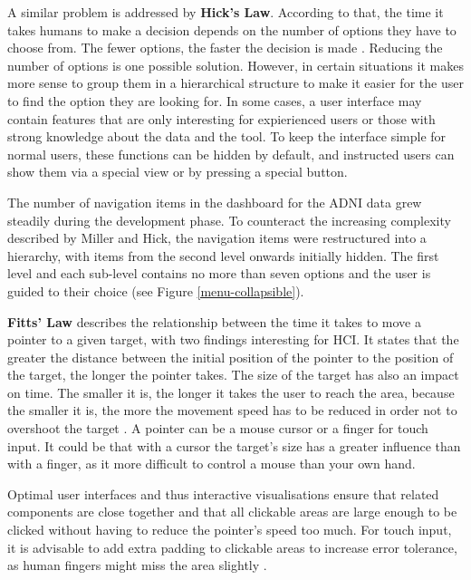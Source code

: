 \documentclass[11pt]{article}
\begin{document}
A similar problem is addressed by \textbf{Hick's Law}. According to that, the time it takes humans to make a decision depends on the number of options they have to choose from. The fewer options, the faster the decision is made \parencite{soegaard_hicks_2020}. Reducing the number of options is one possible solution. However, in certain situations it makes more sense to group them in a hierarchical structure to make it easier for the user to find the option they are looking for. In some cases, a user interface may contain features that are only interesting for expierienced users or those with strong knowledge about the data and the tool. To keep the interface simple for normal users, these functions can be hidden by default, and instructed users can show them via a special view or by pressing a special button. 

The number of navigation items in the dashboard for the ADNI data grew steadily during the development phase. To counteract the increasing complexity described by Miller and Hick, the navigation items were restructured into a hierarchy, with items from the second level onwards initially hidden. The first level and each sub-level contains no more than seven options and the user is guided to their choice (see Figure \ref{menu-collapsible}).

\textbf{Fitts' Law} describes the relationship between the time it takes to move a pointer to a given target, with two findings interesting for HCI. It states that the greater the distance between the initial position of the pointer to the position of the target, the longer the pointer takes. The size of the target has also an impact on time. The smaller it is, the longer it takes the user to reach the area, because the smaller it is, the more the movement speed has to be reduced in order not to overshoot the target \parencite{budiu_fittss_2022}. A pointer can be a mouse cursor or a finger for touch input. It could be that with a cursor the target's size has a greater influence than with a finger, as it more difficult to control a mouse than your own hand. 

Optimal user interfaces and thus interactive visualisations ensure that related components are close together and that all clickable areas are large enough to be clicked without having to reduce the pointer's speed too much. For touch input, it is advisable to add extra padding to clickable areas to increase error tolerance, as human fingers might miss the area slightly \parencite{hoober_fitts_2022}.
\end{document}
